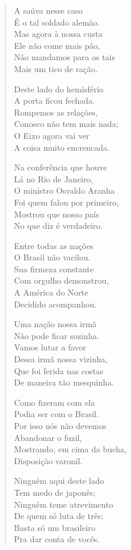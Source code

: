 \begin{verse}
A saúva nesse caso\\
É o tal soldado alemão.\\
Mas agora à nossa custa\\
Ele não come mais pão,\\
Não mandamos para os tais\\
Mais um tico de ração.

Deste lado do hemisfério\\
A porta ficou fechada.\\
Rompemos as relações,\\
Conosco não tem mais nada;\\
O Eixo agora vai ver\\
A coisa muito encrencada.


Na conferência que houve\\
Lá no Rio de Janeiro,\\
O ministro Osvaldo Aranha\\
Foi quem falou por primeiro,\\
Mostrou que nosso país\\
No que diz é verdadeiro.

Entre todas as nações\\
O Brasil não vacilou.\\
Sua firmeza constante\\
Com orgulho demonstrou,\\
A América do Norte\\
Decidido acompanhou.

Uma nação nossa irmã\\
Não pode ficar sozinha.\\
Vamos lutar a favor\\
Dessa irmã nossa vizinha,\\
Que foi ferida nas costas\\
De maneira tão mesquinha.

Como fizeram com ela\\
Podia ser com o Brasil.\\
Por isso nós não devemos\\
Abandonar o fuzil,\\
Mostrando, em cima da bucha,\\
Disposição varonil.


Ninguém aqui deste lado\\
Tem medo de japonês;\\
Ninguém teme atrevimento\\
De quem só luta de três;\\
Basta só um brasileiro\\
Pra dar conta de vocês.


\end{verse}
